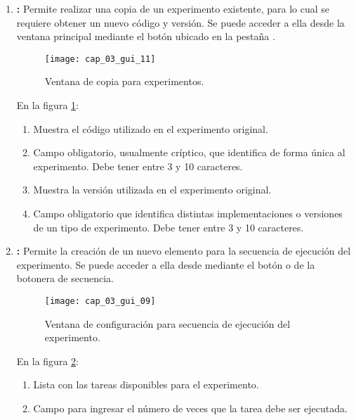 \documentclass[\main/Main.tex]{subfiles}
\begin{document}
\begin{enumerate}
				\item \textbf{:} Permite realizar una copia de un experimento existente, para lo cual se requiere obtener un nuevo código y versión. Se puede acceder a ella desde la ventana principal mediante el botón  ubicado en la pestaña .
				\begin{figure}[H]
					\centering
					\texttt{[image: cap\_03\_gui\_11]}
					\caption{Ventana de copia para experimentos.}
					\label{fig:03_gui_exp_cpy}
				\end{figure}

				\vspace{-5mm}

				En la figura \ref{fig:03_gui_exp_cpy}:
				\begin{enumerate}[(1)]\setlength\itemsep{-0.5em}
					\item Muestra el código utilizado en el experimento original.
					\item Campo obligatorio, usualmente críptico, que identifica de forma única al experimento. Debe tener entre 3 y 10 caracteres.
					\item Muestra la versión utilizada en el experimento original.  
					\item Campo obligatorio que identifica distintas implementaciones o versiones de un tipo de experimento. Debe tener entre 3 y 10 caracteres.
				\end{enumerate}

				\item \textbf{:} Permite la creación de un nuevo elemento para la secuencia de ejecución del experimento. Se puede acceder a ella desde  mediante el botón  o  de la botonera de secuencia. 
				\begin{figure}[H]
					\centering
					\texttt{[image: cap\_03\_gui\_09]}
					\caption{Ventana de configuración para secuencia de ejecución del experimento.}
					\label{fig:03_gui_exp_seq}
				\end{figure}

				\vspace{-5mm}

				En la figura \ref{fig:03_gui_exp_seq}:
				\begin{enumerate}[(1)]\setlength\itemsep{-0.5em}
					\item Lista con las tareas disponibles para el experimento.
					\item Campo para ingresar el número de veces que la tarea debe ser ejecutada.
				\end{enumerate}


\end{enumerate}
\end{document}
